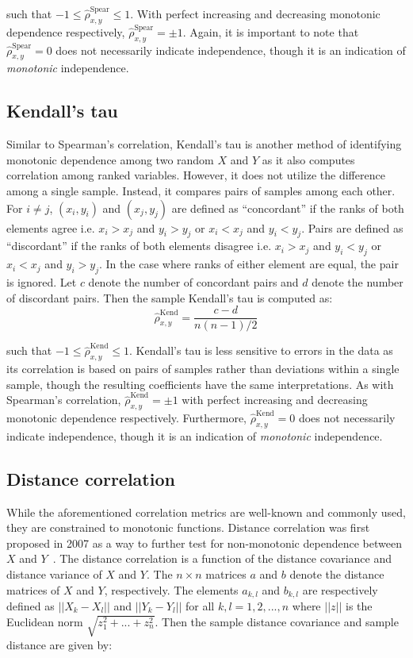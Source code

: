 \noindent such that $-1 \leq \hat{\rho}_{x,y}^{\text{Spear}} \leq 1$. With 
perfect increasing and decreasing monotonic dependence respectively,
$\hat{\rho}_{x,y}^{\text{Spear}} = \pm1$. Again, it is important to note that 
$\hat{\rho}_{x,y}^{\text{Spear}}=0$ does not necessarily indicate 
independence, though it is an indication of \textit{monotonic} independence.

\subsection{Kendall's tau}

Similar to Spearman's correlation, Kendall's tau is another method of
identifying monotonic dependence among two random $X$ and $Y$ as it also
computes correlation among ranked variables. However, it does not utilize the
difference among a single sample. Instead, it compares pairs of samples among
each other. For $i\not=j$, $(x_i,y_i)$ and $(x_j,y_j)$ are defined as
``concordant'' if the ranks of both elements agree i.e. $x_i > x_j$ and $y_i >
y_j$ or $x_i < x_j$ and $y_i < y_j$. Pairs are defined as ``discordant'' if the
ranks of both elements disagree i.e. $x_i > x_j$ and $y_i < y_j$ or $x_i < x_j$
and $y_i > y_j$. In the case where ranks of either element are equal, the pair
is ignored. Let $c$ denote the number of concordant pairs and $d$ denote the 
number of discordant pairs. Then the sample Kendall's tau is computed as:
$$\hat{\rho}_{x,y}^{\text{Kend}}=\frac{c-d}{n(n-1)/2}$$

\noindent such that $-1 \leq \hat{\rho}_{x,y}^{\text{Kend}} \leq 1$. 
Kendall's tau is less sensitive to errors in the data as its correlation is
based on pairs of samples rather than deviations within a single sample, though 
the resulting coefficients have the same interpretations. As with Spearman's
correlation, $\hat{\rho}_{x,y}^{\text{Kend}}=\pm1$ with perfect increasing 
and decreasing monotonic dependence respectively. Furthermore, 
$\hat{\rho}_{x,y}^{\text{Kend}}=0$ does not necessarily indicate
independence, though it is an indication of \textit{monotonic} independence.

\subsection{Distance correlation}

While the aforementioned correlation metrics are well-known and commonly used, 
they are constrained to monotonic functions. Distance correlation was first 
proposed in 2007 as a way to further test for non-monotonic dependence between 
$X$ and $Y$~\cite{szekely2007}. The distance correlation is a function of the 
distance covariance and distance variance of $X$ and $Y$. The $n\times n$ 
matrices $a$ and $b$ denote the distance matrices of $X$ and $Y$, 
respectively. The elements $a_{k,l}$ and $b_{k,l}$ are respectively defined as 
$||X_k-X_l||$ and $||Y_k-Y_l||$ for all $k,l=1,2,...,n$ where $||z||$ is the 
Euclidean norm $\sqrt{z_1^2+...+z_n^2}$. Then the sample distance 
covariance and sample distance are given by:

